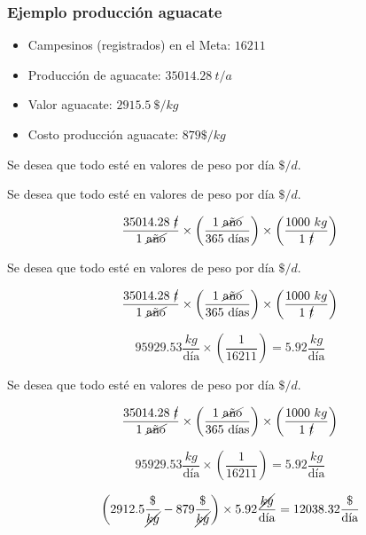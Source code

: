 \documentclass[17pt, t, lualatex]{beamer}
\begin{document}
\begin{frame}[allowframebreaks]
  \frametitle{Ejemplo producción aguacate}
  
  \begin{itemize}
    \item Campesinos (registrados) en el Meta: $16211$\cite{EVA2020}
    \item Producción de aguacate: $35014.28\ t/a$\cite{EVA2020}
    \item Valor aguacate: $2915.5\ \$/kg$\cite{CifrasSectoriales2021}
    \item Costo producción aguacate: $879 \$/kg$\cite{Finagro2022}
  \end{itemize}

\end{frame}

\begin{frame}[allowframebreaks]

  Se desea que todo esté en valores de peso por día $\$/d$.

\end{frame}


\begin{frame}[allowframebreaks]

  Se desea que todo esté en valores de peso por día $\$/d$.

    \[
    \frac{35014.28\ \cancel{t}}{1\  \cancel{\text{año}}} \times \left( \frac{1 \  \cancel{\text{año}}}{365 \ \text{días}}  \right) \times \left( \frac{1000\ kg}{1 \ \cancel{t}} \right)
    \]

\end{frame}


\begin{frame}[allowframebreaks]

  Se desea que todo esté en valores de peso por día $\$/d$.

    \[
    \frac{35014.28\ \cancel{t}}{1\  \cancel{\text{año}}} \times \left( \frac{1 \  \cancel{\text{año}}}{365 \ \text{días}}  \right) \times \left( \frac{1000\ kg}{1 \ \cancel{t}} \right)
  \]

  \[
    95929.53 \frac{kg}{\text{día}} \times \left( \frac{1}{16211}\right) = 5.92 \frac{kg}{\text{día}} 
  \]

\end{frame}


\begin{frame}[allowframebreaks]

  Se desea que todo esté en valores de peso por día $\$/d$.

    \[
    \frac{35014.28\ \cancel{t}}{1\  \cancel{\text{año}}} \times \left( \frac{1 \  \cancel{\text{año}}}{365 \ \text{días}}  \right) \times \left( \frac{1000\ kg}{1 \ \cancel{t}} \right)
  \]

  \[
    95929.53 \frac{kg}{\text{día}} \times \left( \frac{1}{16211}\right) = 5.92 \frac{kg}{\text{día}} 
  \]

  \[
    \left(2912.5 \frac{\$}{\cancel{kg}} - 879 \frac{\$}{\cancel{kg}} \right) \times 5.92 \frac{\cancel{kg}}{\text{día}} = 12038.32 \frac{\$}{\text{día}}
  \]

\end{frame}
\end{document}
